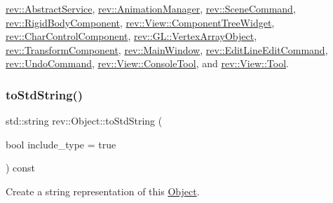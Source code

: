 \mbox{\hyperlink{classrev_1_1_abstract_service_a062e932eaa2eab0109288f2b32e459f7}{rev\+::\+Abstract\+Service}}, \mbox{\hyperlink{classrev_1_1_animation_manager_a7654304032196589413ddb5fec41981b}{rev\+::\+Animation\+Manager}}, \mbox{\hyperlink{classrev_1_1_scene_command_a8914ef927fc5bcf9071ab857c4c636a4}{rev\+::\+Scene\+Command}}, \mbox{\hyperlink{classrev_1_1_rigid_body_component_ae206ce233b7fffd3781cc37bbfc6e17d}{rev\+::\+Rigid\+Body\+Component}}, \mbox{\hyperlink{classrev_1_1_view_1_1_component_tree_widget_aabf1838a1bf9240def872d8526b3aa4b}{rev\+::\+View\+::\+Component\+Tree\+Widget}}, \mbox{\hyperlink{classrev_1_1_char_control_component_a62ac7aa35e708a0f0fcde627bababfd9}{rev\+::\+Char\+Control\+Component}}, \mbox{\hyperlink{classrev_1_1_g_l_1_1_vertex_array_object_a98604a2e7bba755dbedf60a4bf1ddfbb}{rev\+::\+G\+L\+::\+Vertex\+Array\+Object}}, \mbox{\hyperlink{classrev_1_1_transform_component_a7dc2abcb1d759a29c28fc8ceb632a31d}{rev\+::\+Transform\+Component}}, \mbox{\hyperlink{classrev_1_1_main_window_a3d38cd81c10da2fcb09922c9d4dfd990}{rev\+::\+Main\+Window}}, \mbox{\hyperlink{classrev_1_1_edit_line_edit_command_a5289fd61a70c28475698a5f4cf30753b}{rev\+::\+Edit\+Line\+Edit\+Command}}, \mbox{\hyperlink{classrev_1_1_undo_command_aea7ceb3f5ea266e697f01a65da7afec5}{rev\+::\+Undo\+Command}}, \mbox{\hyperlink{classrev_1_1_view_1_1_console_tool_a8168c00a344099bff9626a775408aac4}{rev\+::\+View\+::\+Console\+Tool}}, and \mbox{\hyperlink{classrev_1_1_view_1_1_tool_ab5359d977478b9c3e30267bcc4e4a853}{rev\+::\+View\+::\+Tool}}.

\mbox{\label{classrev_1_1_object_a825ec2ff288b47272e733b1500c2798a}} 
\subsubsection{\texorpdfstring{toStdString()}{toStdString()}}
{\footnotesize\ttfamily std\+::string rev\+::\+Object\+::to\+Std\+String (\begin{DoxyParamCaption}\item[{bool}]{include\+\_\+type = {\ttfamily true} }\end{DoxyParamCaption}) const\hspace{0.3cm}{\ttfamily [virtual]}}



Create a string representation of this \mbox{\hyperlink{classrev_1_1_object}{Object}}. 

